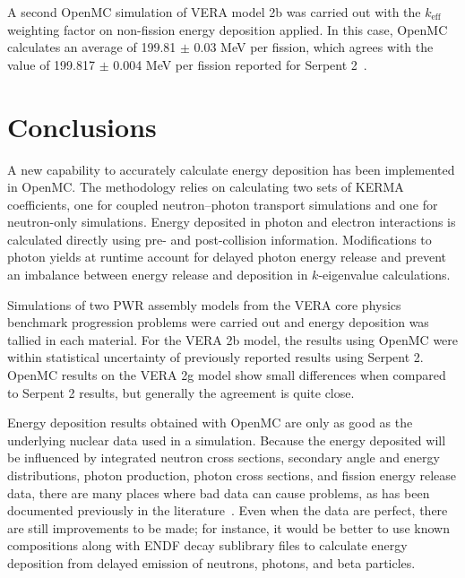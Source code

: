 \documentclass{anstrans}
\begin{document}
A second OpenMC simulation of VERA model 2b was carried out with the
$k_\text{eff}$ weighting factor on non-fission energy deposition applied. In
this case, OpenMC calculates an average of 199.81 $\pm$ 0.03 MeV per fission,
which agrees with the value of 199.817 $\pm$ 0.004 MeV per fission reported for
Serpent 2~\cite{tuominen2019ane}.


\section{Conclusions}

A new capability to accurately calculate energy deposition has been implemented
in OpenMC. The methodology relies on calculating two sets of KERMA coefficients,
one for coupled neutron--photon transport simulations and one for neutron-only
simulations. Energy deposited in photon and electron interactions is calculated
directly using pre- and post-collision information. Modifications to photon
yields at runtime account for delayed photon energy release and prevent an
imbalance between energy release and deposition in $k$-eigenvalue calculations.

Simulations of two PWR assembly models from the VERA core physics benchmark
progression problems were carried out and energy deposition was tallied in each
material. For the VERA 2b model, the results using OpenMC were within
statistical uncertainty of previously reported results using Serpent 2. OpenMC
results on the VERA 2g model show small differences when compared to Serpent 2
results, but generally the agreement is quite close.

Energy deposition results obtained with OpenMC are only as good as the
underlying nuclear data used in a simulation. Because the energy deposited will
be influenced by integrated neutron cross sections, secondary angle and energy
distributions, photon production, photon cross sections, and fission energy
release data, there are many places where bad data can cause problems, as has
been documented previously in the
literature~\cite{trumbull2013mc,tuominen2019ane}. Even when the data are
perfect, there are still improvements to be made; for instance, it would be
better to use known compositions along with ENDF decay sublibrary files to
calculate energy deposition from delayed emission of neutrons, photons, and beta
particles.

\pagebreak

\end{document}
